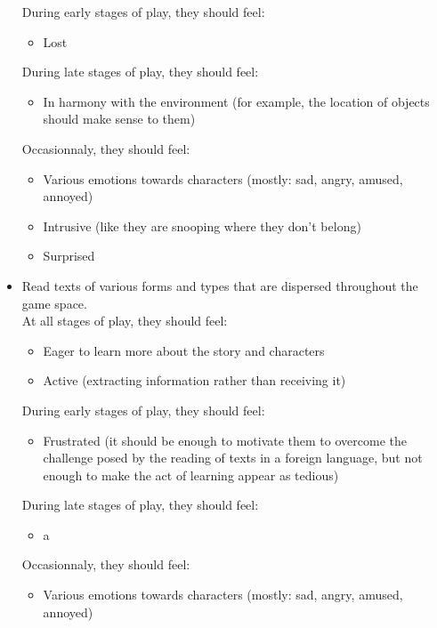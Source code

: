 \documentclass{scrartcl}
\begin{document}
\begin{itemize}
\begin{itemize}
				\end{itemize}
				During early stages of play, they should feel: 
				\begin{itemize}
					\item Lost
				\end{itemize}
				During late stages of play, they should feel:
				\begin{itemize}
					\item In harmony with the environment (for example, the location of objects should make sense to them)
				\end{itemize}
				Occasionnaly, they should feel:
				\begin{itemize}
					\item Various emotions towards characters (mostly: sad, angry, amused, annoyed)
					\item Intrusive (like they are snooping where they don't belong)
					\item Surprised
				\end{itemize}
				\item Read texts of various forms and types that are dispersed throughout the game space.\\
				At all stages of play, they should feel:
				\begin{itemize}
					\item Eager to learn more about the story and characters
					\item Active (extracting information rather than receiving it)
				\end{itemize}
				During early stages of play, they should feel: 
				\begin{itemize}
					\item Frustrated (it should be enough to motivate them to overcome the challenge posed by the reading of texts in a foreign language, but not enough to make the act of learning appear as tedious)
				\end{itemize}
				During late stages of play, they should feel:
				\begin{itemize}
					\item a
				\end{itemize}
				Occasionnaly, they should feel:
				\begin{itemize}
					\item Various emotions towards characters (mostly: sad, angry, amused, annoyed)
				\end{itemize}

\end{itemize}
\end{document}
